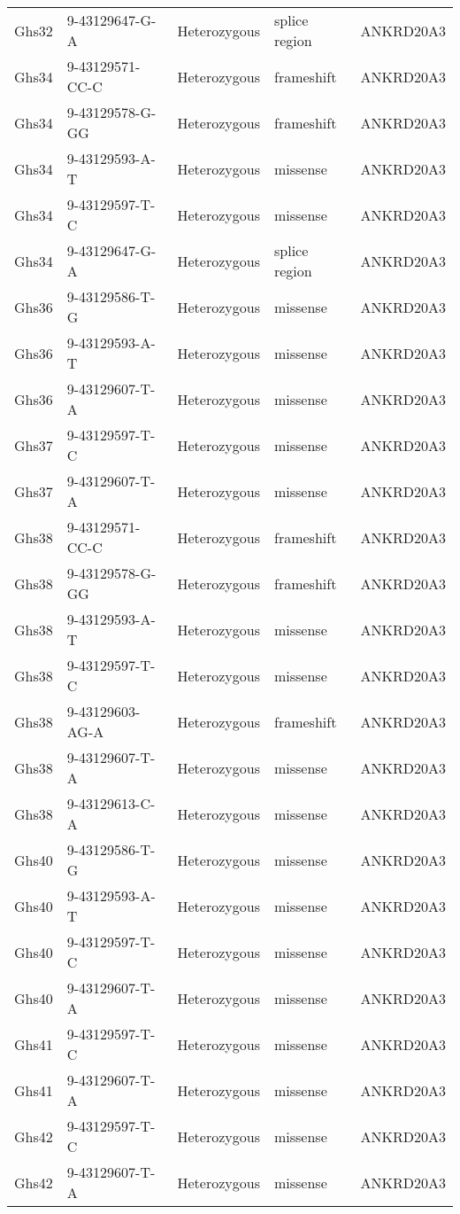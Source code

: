 \documentclass[12pt,twoside]{reedthesis}
\theoremstyle{definition}
\theoremstyle{definition}
\theoremstyle{remark}
\begin{document}
\begin{longtable}[t]{lllll}
  \addlinespace
  Ghs32 & 9-43129647-G-A & Heterozygous & splice region & ANKRD20A3\\
  Ghs34 & 9-43129571-CC-C & Heterozygous & frameshift & ANKRD20A3\\
  Ghs34 & 9-43129578-G-GG & Heterozygous & frameshift & ANKRD20A3\\
  Ghs34 & 9-43129593-A-T & Heterozygous & missense & ANKRD20A3\\
  Ghs34 & 9-43129597-T-C & Heterozygous & missense & ANKRD20A3\\
  \addlinespace
  Ghs34 & 9-43129647-G-A & Heterozygous & splice region & ANKRD20A3\\
  Ghs36 & 9-43129586-T-G & Heterozygous & missense & ANKRD20A3\\
  Ghs36 & 9-43129593-A-T & Heterozygous & missense & ANKRD20A3\\
  Ghs36 & 9-43129607-T-A & Heterozygous & missense & ANKRD20A3\\
  Ghs37 & 9-43129597-T-C & Heterozygous & missense & ANKRD20A3\\
  \addlinespace
  Ghs37 & 9-43129607-T-A & Heterozygous & missense & ANKRD20A3\\
  Ghs38 & 9-43129571-CC-C & Heterozygous & frameshift & ANKRD20A3\\
  Ghs38 & 9-43129578-G-GG & Heterozygous & frameshift & ANKRD20A3\\
  Ghs38 & 9-43129593-A-T & Heterozygous & missense & ANKRD20A3\\
  Ghs38 & 9-43129597-T-C & Heterozygous & missense & ANKRD20A3\\
  \addlinespace
  Ghs38 & 9-43129603-AG-A & Heterozygous & frameshift & ANKRD20A3\\
  Ghs38 & 9-43129607-T-A & Heterozygous & missense & ANKRD20A3\\
  Ghs38 & 9-43129613-C-A & Heterozygous & missense & ANKRD20A3\\
  Ghs40 & 9-43129586-T-G & Heterozygous & missense & ANKRD20A3\\
  Ghs40 & 9-43129593-A-T & Heterozygous & missense & ANKRD20A3\\
  \addlinespace
  Ghs40 & 9-43129597-T-C & Heterozygous & missense & ANKRD20A3\\
  Ghs40 & 9-43129607-T-A & Heterozygous & missense & ANKRD20A3\\
  Ghs41 & 9-43129597-T-C & Heterozygous & missense & ANKRD20A3\\
  Ghs41 & 9-43129607-T-A & Heterozygous & missense & ANKRD20A3\\
  Ghs42 & 9-43129597-T-C & Heterozygous & missense & ANKRD20A3\\
  Ghs42 & 9-43129607-T-A & Heterozygous & missense & ANKRD20A3\\
  \bottomrule
  \end{longtable}
  
\end{document}
